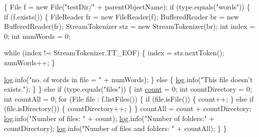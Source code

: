 \begin{DoxyCode}
                                            \{
        File f = \textcolor{keyword}{new} File(\textcolor{stringliteral}{"testDir/"} + parentObjectName);
        \textcolor{keywordflow}{if} (type.equals(\textcolor{stringliteral}{"words"})) \{
            \textcolor{keywordflow}{if} (f.exists()) \{
                FileReader fr = \textcolor{keyword}{new} FileReader(f);
                BufferedReader br = \textcolor{keyword}{new} BufferedReader(fr);
                StreamTokenizer stz = \textcolor{keyword}{new} StreamTokenizer(br);
                \textcolor{keywordtype}{int} index = 0;
                \textcolor{keywordtype}{int} numWords = 0;

                \textcolor{keywordflow}{while} (index != StreamTokenizer.TT\_EOF) \{
                    index = stz.nextToken();
                    numWords++;
                \}

                \hyperlink{classcom_1_1poly_1_1nlp_1_1filekommander_1_1file_1_1actions_1_1_file_action_utils_a7af6d26171248a2e7253d9bce1b287cc}{log}.info(\textcolor{stringliteral}{"no. of words in file = "} + numWords);
            \} \textcolor{keywordflow}{else} \{
                \hyperlink{classcom_1_1poly_1_1nlp_1_1filekommander_1_1file_1_1actions_1_1_file_action_utils_a7af6d26171248a2e7253d9bce1b287cc}{log}.info(\textcolor{stringliteral}{"This file doesn't exists."});
            \}
        \} \textcolor{keywordflow}{else} \textcolor{keywordflow}{if} (type.equals(\textcolor{stringliteral}{"files"})) \{
            \textcolor{keywordtype}{int} \hyperlink{classcom_1_1poly_1_1nlp_1_1filekommander_1_1file_1_1actions_1_1_file_action_utils_a2df1aca8a703f77ff7ca700541d6fb6b}{count} = 0;
            \textcolor{keywordtype}{int} countDirectory = 0;
            \textcolor{keywordtype}{int} countAll = 0;
            \textcolor{keywordflow}{for} (File file : f.listFiles()) \{
                \textcolor{keywordflow}{if} (file.isFile()) \{
                    count++;
                \} \textcolor{keywordflow}{else} \textcolor{keywordflow}{if} (file.isDirectory()) \{
                    countDirectory++;
                \}
            \}
            countAll = count + countDirectory;
            \hyperlink{classcom_1_1poly_1_1nlp_1_1filekommander_1_1file_1_1actions_1_1_file_action_utils_a7af6d26171248a2e7253d9bce1b287cc}{log}.info(\textcolor{stringliteral}{"Number of files: "} + count);
            \hyperlink{classcom_1_1poly_1_1nlp_1_1filekommander_1_1file_1_1actions_1_1_file_action_utils_a7af6d26171248a2e7253d9bce1b287cc}{log}.info(\textcolor{stringliteral}{"Number of folders:"} + countDirectory);
            \hyperlink{classcom_1_1poly_1_1nlp_1_1filekommander_1_1file_1_1actions_1_1_file_action_utils_a7af6d26171248a2e7253d9bce1b287cc}{log}.info(\textcolor{stringliteral}{"Number of files and folders: "} + countAll);
        \}
    \}
\end{DoxyCode}
